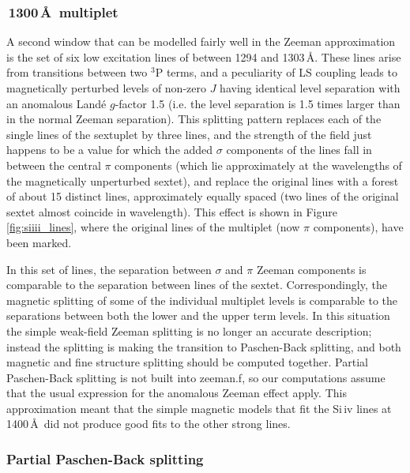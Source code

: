 \documentclass[fleqn,usenatbib]{mnras}
\begin{document}
\subsubsection{\,1300\,\AA\ multiplet}
A second window that can be modelled fairly well in the Zeeman approximation is the set of six low excitation lines of  between 1294 and 1303\,\AA. These lines arise from transitions between two $^3$P terms, and a peculiarity of LS coupling leads to magnetically perturbed levels of non-zero $J$ having identical level separation with an anomalous Land{\'e} $g$-factor 1.5 (i.e. the level separation is 1.5 times larger than in the normal Zeeman separation). This splitting pattern replaces each of the single lines of the sextuplet by three lines, and the strength of the field just happens to be a value for which the added $\sigma$ components of the lines fall in between the central $\pi$ components (which lie approximately at the wavelengths of the magnetically unperturbed sextet), and replace the original lines with a forest of about 15 distinct lines, approximately equally spaced (two lines of the original sextet almost coincide in wavelength). This effect is shown in Figure\,\ref{fig:siiii_lines}, where the original lines of the multiplet (now $\pi$ components), have been marked.

In this set of lines, the separation between $\sigma$ and $\pi$ Zeeman components is comparable to the separation between lines of the sextet. Correspondingly, the magnetic splitting of some of the individual multiplet levels is comparable to the separations between both the lower and the upper term levels. In this situation the simple weak-field Zeeman splitting is no longer an accurate description; instead the splitting is making the transition to Paschen-Back splitting, and both magnetic and fine structure splitting should be computed together. Partial Paschen-Back splitting is not built into {\sc zeeman.f}, so our computations assume that the usual expression for the anomalous Zeeman effect apply. This approximation meant that the simple magnetic models that fit the Si\,{\sc iv} lines at 1400\,\AA\ did not produce good fits to the other strong lines.


\subsubsection{Partial Paschen-Back splitting}
\end{document}
